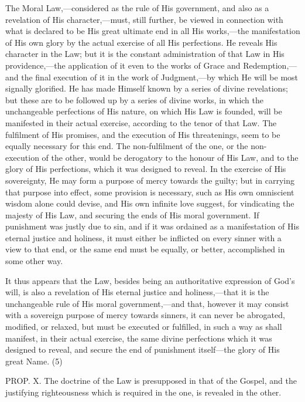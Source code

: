 \documentclass[
]{book}
\begin{document}
The Moral Law,---considered as the rule of His government, and also as a revelation of His character,---must, still further, be viewed in connection with what is declared to be His great ultimate end in all His works,---the manifestation of His own glory by the actual exercise of all His perfections. He reveals His character in the Law; but it is the constant administration of that Law in His providence,---the application of it even to the works of Grace and Redemption,---and the final execution of it in the work of Judgment,---by which He will be most signally glorified. He has made Himself known by a series of divine revelations; but these are to be followed up by a series of divine works, in which the unchangeable perfections of His nature, on which His Law is founded, will be manifested in their actual exercise, according to the tenor of that Law. The fulfilment of His promises, and the execution of His threatenings, seem to be equally necessary for this end. The non-fulfilment of the one, or the non-execution of the other, would be derogatory to the honour of His Law, and to the glory of His perfections, which it was designed to reveal. In the exercise of His sovereignty, He may form a purpose of mercy towards the guilty; but in carrying that purpose into effect, some provision is necessary, such as His own omniscient wisdom alone could devise, and His own infinite love suggest, for vindicating the majesty of His Law, and securing the ends of His moral government. If punishment was justly due to sin, and if it was ordained as a manifestation of His eternal justice and holiness, it must either be inflicted on every sinner with a view to that end, or the same end must be equally, or better, accomplished in some other way.

It thus appears that the Law, besides being an authoritative expression of God's will, is also a revelation of His eternal justice and holiness,---that it is the unchangeable rule of His moral government,---and that, however it may consist with a sovereign purpose of mercy towards sinners, it can never be abrogated, modified, or relaxed, but must be executed or fulfilled, in such a way as shall manifest, in their actual exercise, the same divine perfections which it was designed to reveal, and secure the end of punishment itself---the glory of His great Name. (5)

PROP. X. The doctrine of the Law is presupposed in that of the Gospel, and the justifying righteousness which is required in the one, is revealed in the other.
\end{document}
